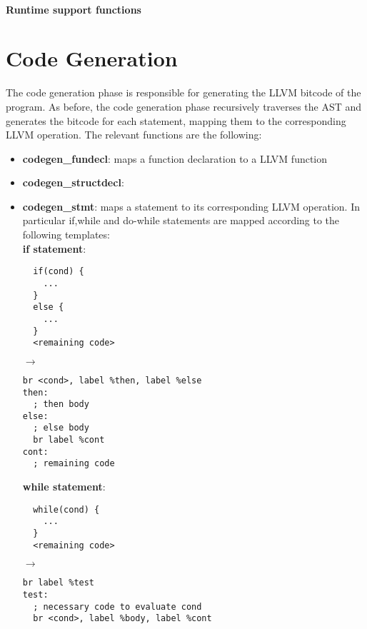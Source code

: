 \documentclass{article}
\begin{document}
\paragraph*{Runtime support functions}


\section{Code Generation}
The code generation phase is responsible for generating the LLVM bitcode of the program.
As before, the code generation phase recursively traverses the AST and generates the bitcode for each statement, mapping
them to the corresponding LLVM operation.
The relevant functions are the following:
\begin{itemize}
  \item \textbf{codegen\_fundecl}: maps a function declaration to a LLVM function
  \item \textbf{codegen\_structdecl}:
  \item \textbf{codegen\_stmt}: maps a statement to its corresponding LLVM operation.
  In particular if,while and do-while statements are mapped according to
  the following templates: \\
  \textbf{if statement}: \\

\begin{minipage}{0.20\textwidth}
\begin{verbatim}
  if(cond) {
    ...
  }
  else {
    ...
  }
  <remaining code>
\end{verbatim}
\end{minipage}
\hspace{1cm} $\rightarrow$ \hspace{0.5cm}
\begin{minipage}{0.45\textwidth}
\begin{verbatim}
br <cond>, label %then, label %else
then:
  ; then body
else:
  ; else body
  br label %cont
cont:
  ; remaining code
\end{verbatim}
\end{minipage}


\textbf{while statement}: \\

\begin{minipage}{0.20\textwidth}
\begin{verbatim}
  while(cond) {
    ...
  }
  <remaining code>
\end{verbatim}
\end{minipage}
\hspace{1cm} $\rightarrow$ \hspace{0.5cm}
\begin{minipage}{0.45\textwidth}
\begin{verbatim}
br label %test
test:
  ; necessary code to evaluate cond
  br <cond>, label %body, label %cont


\end{verbatim}
\end{minipage}
\end{itemize}
\end{document}
